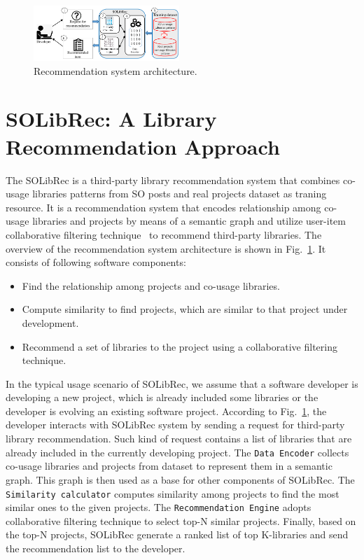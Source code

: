 \documentclass[paper]{ieice}
\begin{document}
\begin{figure}[ht]
	\centering
	\includegraphics[width=0.49\textwidth]{architecture.pdf}
	\caption{Recommendation system architecture.} 
	\label{fig:method}
\end{figure}

\section{SOLibRec: A Library Recommendation Approach}
\label{sec:SOLibRec}
The SOLibRec is a third-party library recommendation system that combines co-usage libraries patterns from SO posts and real projects dataset as traning resource.
It is a recommendation system that encodes relationship among co-usage libraries and projects by means of a semantic graph and utilize user-item collaborative filtering technique~\cite{schafer2007collaborative} to recommend third-party libraries. 
The overview of the recommendation system architecture is shown in Fig.~\ref{fig:method}. 
It consists of following software components:
\begin{itemize}
    \item Find the relationship among projects and co-usage libraries.
    \item Compute similarity to find projects, which are similar to that project under development.
    \item Recommend a set of libraries to the project using a collaborative filtering technique.
    
\end{itemize}

In the typical usage scenario of SOLibRec, we assume that a software developer is developing a new project, which is already included some libraries or the developer is evolving an existing software project.
According to Fig.~\ref{fig:method}, the developer interacts with SOLibRec system by sending a request for third-party library recommendation. 
Such kind of request contains a list of libraries that are already included in the currently developing project. 
The \texttt{Data Encoder} collects co-usage libraries and projects from dataset to represent them in a semantic graph. This graph is then used as a base for other components of SOLibRec.
The \texttt{Similarity calculator} computes similarity among projects to find the most similar ones to the given projects. 
The \texttt{Recommendation Engine} adopts collaborative filtering technique to select top-N similar projects. 
Finally, based on the top-N projects, SOLibRec generate a ranked list of top K-libraries and send the recommendation list to the developer.
\end{document}
